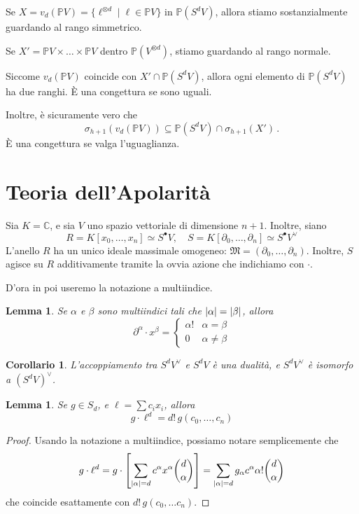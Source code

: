 \documentclass[a4paper, 11pt]{article}
\theoremstyle{definition}
\theoremstyle{plain}
\newtheorem{Lemma}[Def]{Lemma}
\newtheorem{Cor}[Def]{Corollario}
\DeclarePairedDelimiter{\abs}{\lvert}{\rvert}
\newcommand{\PP}{\mathbb{P}}
\newcommand{\C}{\mathbb{C}}
\newcommand{\MM}{\mathfrak{M}}
\begin{document}
Se $X = v_d(\PP V) = \{\ell^{\otimes d} \mid \ell \in \PP V\}$ in $\PP(S^d V)$, allora stiamo sostanzialmente guardando al rango simmetrico.

Se $X' = \PP V \times \dots \times \PP V$ dentro $\PP(V^{\otimes d})$, stiamo guardando al rango normale.

Siccome $v_d(\PP V)$ coincide con $X' \cap \PP(S^d V)$, allora ogni elemento di $\PP(S^dV)$ ha due ranghi. È una congettura se sono uguali.

Inoltre, è sicuramente vero che
\[
	\sigma_{h+1}(v_d(\PP V)) \subseteq \PP(S^d V) \cap \sigma_{h+1}(X')\,.
\]
È una congettura se valga l'uguaglianza.\vspace{0.5cm}

\noindent{}
\section{Teoria dell'Apolarità}
Sia $K = \C$, e sia $V$ uno spazio vettoriale di dimensione $n+1$. Inoltre, siano 
\[
	R = K[x_0,\dots, x_n] \simeq S^\bullet V, \quad S = K[\partial_0, \dots, \partial_n] \simeq S^\bullet V^\vee 
\]
L'anello $R$ ha un unico ideale massimale omogeneo: $\MM = (\partial_0, \dots, \partial_n)$. Inoltre, $S$ agisce su $R$ additivamente tramite la ovvia azione che indichiamo con $\cdot$.

D'ora in poi useremo la notazione a multiindice.
\begin{Lemma}\label{Lemma:dualbas}
	Se $\alpha$ e $\beta$ sono multiindici tali che $\abs{\alpha} = \abs{\beta}$, allora
	\[
		\partial^\alpha \cdot x^\beta =
		\begin{cases}
			\alpha! & \alpha = \beta \\
			0 & \alpha \neq \beta
		\end{cases}
	\]
\end{Lemma}
\begin{Cor}
	L'accoppiamento tra $S^dV^\vee$ e $S^dV$ è una dualità, e $S^d V^\vee$ è isomorfo a $(S^dV)^\vee$.
\end{Cor}
\begin{Lemma}\label{Lemma:gelld}
	Se $g \in S_d$, e $\ell = \sum c_i x_i$, allora
	\[
		g\cdot\ell^d = d!\,g(c_0, \dots, c_n)
	\]
\end{Lemma}
\begin{proof}
	Usando la notazione a multiindice, possiamo notare semplicemente che
	\[
		g\cdot \ell^d = g\cdot\left[\sum_{\abs{\alpha} = d}c^\alpha x^\alpha\binom{d}{\alpha}\right] = \sum_{\abs{\alpha} = d}g_\alpha c^\alpha\alpha!\binom{d}{\alpha}
	\]
	che coincide esattamente con $d!\,g(c_0, \dots c_n)$.
\end{proof}
\end{document}
